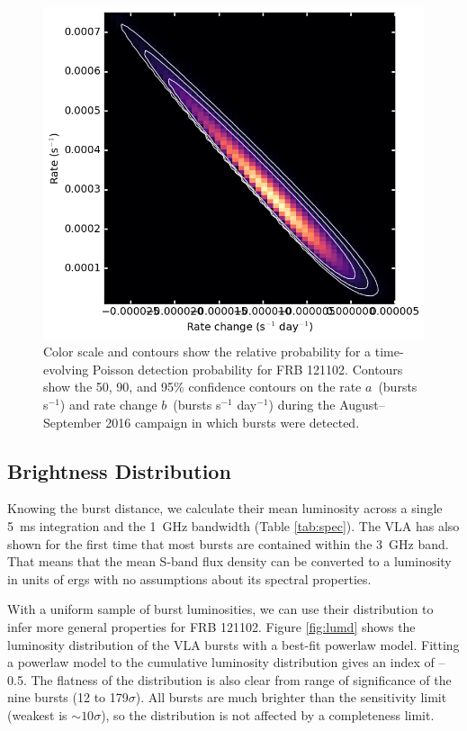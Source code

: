 \documentclass[twocolumn]{aastex61}
\newcommand{\frb}{FRB 121102}
\begin{document}
\begin{figure}[htb]
\begin{center}
\includegraphics[width=0.9\columnwidth]{event_rate_contours}
\caption{Color scale and contours show the relative probability for a time-evolving Poisson detection probability for \frb. Contours show the 50, 90, and 95\% confidence contours on the rate $a$\ (bursts s$^{-1}$) and rate change $b$\ (bursts s$^{-1}$ day$^{-1}$) during the August--September 2016 campaign in which bursts were detected.
\label{fig:rate}}
\end{center}
\end{figure}

\subsection{Brightness Distribution}
Knowing the burst distance, we calculate their mean luminosity across a single 5~ms integration and the 1~GHz bandwidth (Table \ref{tab:spec}). The VLA has also shown for the first time that most bursts are contained within the 3~GHz band. That means that the mean S-band flux density can be converted to a luminosity in units of ergs with no assumptions about its spectral properties.

With a uniform sample of burst luminosities, we can use their distribution to infer more general properties for \frb. Figure \ref{fig:lumd} shows the luminosity distribution of the VLA bursts with a best-fit powerlaw model. Fitting a powerlaw model to the cumulative luminosity distribution gives an index of --0.5. The flatness of the distribution is also clear from range of significance of the nine bursts (12 to 179$\sigma$). All bursts are much brighter than the sensitivity limit (weakest is $\sim10\sigma$), so the distribution is not affected by a completeness limit.
\end{document}
